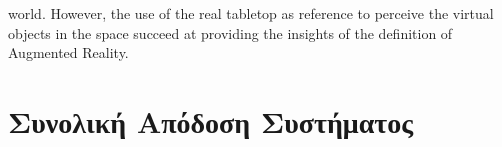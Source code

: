 world. However, the use of the real tabletop as reference to perceive the virtual objects in the space succeed at providing the insights of the definition of Augmented Reality.

\section{Συνολική Απόδοση Συστήματος}

